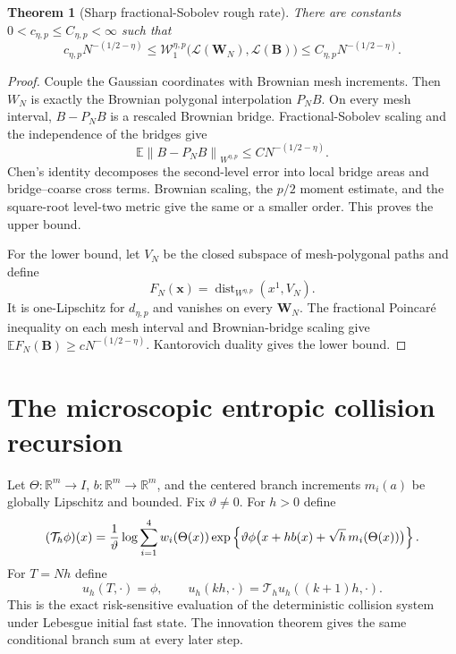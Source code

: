 \documentclass[11pt,reqno]{amsart}
\newtheorem{theorem}{Theorem}[section]
\theoremstyle{definition}
\theoremstyle{remark}
\newcommand{\E}{\mathbb E}
\newcommand{\R}{\mathbb R}
\newcommand{\dist}{\operatorname{dist}}
\newcommand{\norm}[1]{\left\lVert #1\right\rVert}
\begin{document}
\begin{theorem}[Sharp fractional-Sobolev rough rate]\label{thm:rate}
There are constants $0<c_{\eta,p}\le C_{\eta,p}<\infty$ such that
\begin{equation}\label{eq:rate}
 c_{\eta,p}N^{-(1/2-\eta)}
 \le\mathcal W_1^{\eta,p}
 \bigl(\mathcal L(\mathbf W_N),\mathcal L(\mathbf B)\bigr)
 \le C_{\eta,p}N^{-(1/2-\eta)}.
\end{equation}
\end{theorem}

\begin{proof}
Couple the Gaussian coordinates with Brownian mesh increments.  Then $W_N$ is
exactly the Brownian polygonal interpolation $P_NB$.  On every mesh interval,
$B-P_NB$ is a rescaled Brownian bridge.  Fractional-Sobolev scaling and the
independence of the bridges give
\[
 \E\norm{B-P_NB}_{W^{\eta,p}}
 \le CN^{-(1/2-\eta)}.
\]
Chen's identity decomposes the second-level error into local bridge areas and
bridge--coarse cross terms.  Brownian scaling, the $p/2$ moment estimate, and
the square-root level-two metric give the same or a smaller order.  This proves
the upper bound.

For the lower bound, let $V_N$ be the closed subspace of mesh-polygonal paths
and define
\[
 F_N(\mathbf x)=\dist_{W^{\eta,p}}(x^1,V_N).
\]
It is one-Lipschitz for $d_{\eta,p}$ and vanishes on every $\mathbf W_N$.
The fractional Poincar\'e inequality on each mesh interval and Brownian-bridge
scaling give
$\E F_N(\mathbf B)\ge cN^{-(1/2-\eta)}$.  Kantorovich duality gives the lower
bound.
\end{proof}

\section{The microscopic entropic collision recursion}

Let $\Theta:\R^m\to I$, $b:\R^m\to\R^m$, and the centered branch increments
$m_i(a)$ be globally Lipschitz and bounded.  Fix $\vartheta\ne0$.  For $h>0$
define
\begin{equation}\label{eq:Th}
 (\mathcal T_h\phi)(x)=
 {1\over\vartheta}\log
 \sum_{i=1}^4w_i(\Theta(x))
 \exp\left\{\vartheta
 \phi\bigl(x+hb(x)+\sqrt h\,m_i(\Theta(x))\bigr)\right\}.
\end{equation}
For $T=Nh$ define
\begin{equation}\label{eq:recursion}
 u_h(T,\cdot)=\phi,\qquad
 u_h(kh,\cdot)=\mathcal T_hu_h((k+1)h,\cdot).
\end{equation}
This is the exact risk-sensitive evaluation of the deterministic collision
system under Lebesgue initial fast state.  The innovation theorem gives the
same conditional branch sum at every later step.
\end{document}
